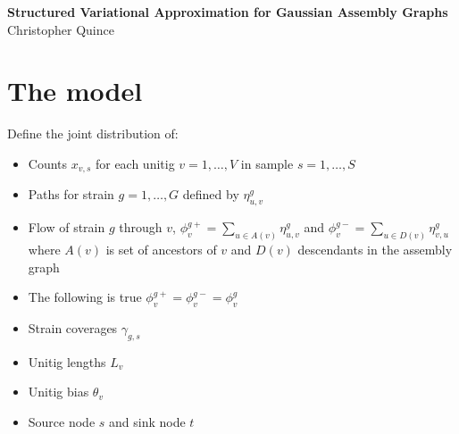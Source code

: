 \documentclass[10pt]{article}
\date{}
\newcommand\titlestring{Structured Variational Approximation for Gaussian Assembly Graphs}
\newcommand\authorstring{Christopher Quince}
\begin{document}
\begin{flushleft}
  {\Large
    \textbf{\titlestring}
  }
\\
\authorstring
\end{flushleft}

\section{The model}

Define the joint distribution of: 
\begin{itemize}

\item Counts $x_{v,s}$ for each unitig $v = 1,\ldots,V$ in sample $s = 1,\ldots,S$

\item Paths for strain $g = 1,\ldots,G$ defined by $\eta^g_{u,v}$

\item Flow of strain $g$ through $v$, $\phi^{g+}_v = \sum_{u \in A(v)} \eta^g_{u,v}$ 
and $\phi^{g-}_v = \sum_{u \in D(v)} \eta^g_{v,u}$ where $A(v)$ is set of ancestors of $v$ 
and $D(v)$ descendants in the assembly graph

\item The following is true  $\phi^{g+}_v =  \phi^{g-}_v = \phi^{g}_v$

\item Strain coverages $\gamma_{g,s}$

\item Unitig lengths $L_v$

\item Unitig bias $\theta_v$

\item Source node $s$ and sink node $t$

\end{itemize}
\end{document}

